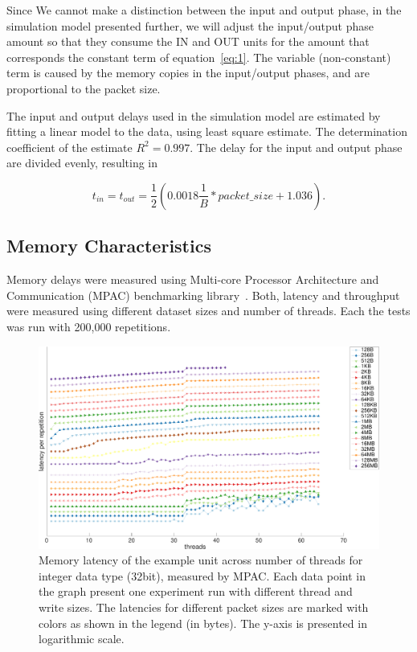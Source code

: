 Since We cannot make a distinction between the input and output phase, in the simulation model presented further, we will adjust the input/output phase amount so that they consume the IN and OUT units for the amount that corresponds the constant term of equation~\ref{eq:1}. The variable (non-constant) term is caused by the memory copies in the input/output phases, and are proportional to the packet size.

The input and output delays used in the simulation model are estimated by fitting a linear model to the data, using least square estimate. The determination coefficient of the estimate $R^2 = 0.997$. The delay for the input and output phase are divided evenly, resulting in

\begin{equation}
  \label{eq:1}
  t_{in} = t_{out} = \frac{1}{2}(0.0018\frac{1}{B} * packet\_size + 1.036).
\end{equation}

\subsection{Memory Characteristics}
\label{sec:memory-characteristics}

Memory delays were measured using Multi-core Processor Architecture and Communication (MPAC) benchmarking library~\cite{Jamal:2009:MPAC}. Both, latency and throughput were measured using different dataset sizes and number of threads. Each the tests was run with 200,000 repetitions.

\begin{figure}[]
  \begin{center}
    \includegraphics[width=\textwidth]{images/mem-latency.pdf}
    \caption{Memory latency of the example unit across number of threads for integer data type (32bit), measured by MPAC. Each data point in the graph present one experiment run with different thread and write sizes. The latencies for different packet sizes are marked with colors as shown in the legend (in bytes). The y-axis is presented in logarithmic scale.}
    \label{fig:mem-latency}
  \end{center}
\end{figure}

